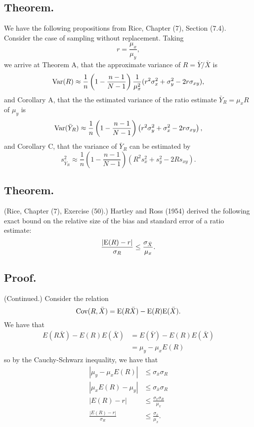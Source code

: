 \documentclass[titlepage]{article}
\begin{document}
\subsection{Theorem.} We have the following propositions from Rice, Chapter (7), Section (7.4). Consider the case of sampling without replacement. Taking 
$$r = \frac{\mu_{x}}{\mu_{y}},$$
we arrive at Theorem A, that the approximate variance of $R = \bar{Y}/\bar{X}$ is 
$$\text{Var}(R) \approx \frac{1}{n}\left(1 - \frac{n-1}{N-1}\right)\frac{1}{\mu_{x}^{2}}
                  (r^{2}\sigma_{x}^{2} + \sigma_{y}^{2} - 2r\sigma_{xy}),$$
and Corollary A, that the the estimated variance of the ratio estimate $\bar{Y}_{R} = \mu_{x}R$ of $\mu_{y}$ is 
$$\text{Var}(\bar{Y}_{R}) \approx \frac{1}{n}\left(1 - \frac{n-1}{N-1}\right)\left(r^{2}\sigma_{y}^{2} 
                  + \sigma_{x}^{2} - 2r\sigma_{xy}\right),$$
and Corollary C, that the variance of $\bar{Y}_{R}$ can be estimated by 
$$s^{2}_{\bar{Y}_{R}} \approx \frac{1}{n}\left(1 - \frac{n-1}{N-1}\right)(R^{2}s_{x}^{2} + s_{y}^{2} - 2Rs_{xy}).$$

\subsection{Theorem.} (Rice, Chapter (7), Exercise (50).) Hartley and Ross (1954) derived the following exact bound on the relative size of the bias and 
standard error of a ratio estimate:
$$\frac{|\text{E}(R) - r|}{\sigma_{R}} \leq \frac{\sigma_{\bar{X}}}{\mu_{x}}.$$

\subsection{Proof.} (Continued.) Consider the relation
$$\text{Cov}(R, \bar{X}) = \text{E}(R\bar{X}) - \text{E}(R)\text{E}(\bar{X}).$$
We have that 
\begin{align*}
    E(R\bar{X}) - E(R)E(\bar{X}) &= E(\bar{Y}) - E(R)E(\bar{X}) \\
                                 &= \mu_{y} - \mu_{x}E(R)
\end{align*}
so by the Cauchy-Schwarz inequality, we have that 
\begin{align*}
    |\mu_{y} - \mu_{x}E(R)| &\leq \sigma_{\bar{x}}\sigma_{R} \\
    |\mu_{x}E(R) - \mu_{y}| &\leq \sigma_{\bar{x}}\sigma_{R} \\
    |E(R) - r| &\leq \frac{\sigma_{\bar{x}}\sigma_{R}}{\mu_{x}} \\
    \frac{|E(R) - r|}{\sigma_{R}} &\leq \frac{\sigma_{\bar{x}}}{\mu_{x}}.
\end{align*}
\end{document}
